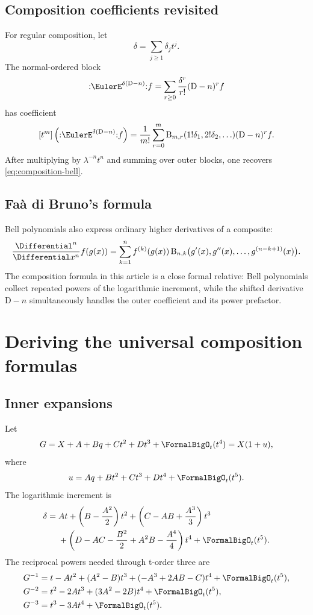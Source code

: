 \documentclass[11pt,openany]{book}
\theoremstyle{definition}
\theoremstyle{plain}
\theoremstyle{remark}
\newcommand{\Bell}{\operatorname{B}}
\newcommand{\Dop}{\mathrm{D}}
\begin{document}
\section{Composition coefficients revisited}
For regular composition, let
\[
 \delta=\sum_{j\ge1}\delta_jt^j.
\]
The normal-ordered block
\[
 \mathopen{:}\EulerE^{\delta(\Dop-n)}\mathclose{:}f
 =\sum_{r\ge0}\frac{\delta^r}{r!}(\Dop-n)^rf
\]
has coefficient
\begin{equation}\label{eq:bell-normal-block}
 [t^m]\left(
 \mathopen{:}\EulerE^{\delta(\Dop-n)}\mathclose{:}f
 \right)
 =\frac1{m!}\sum_{r=0}^m
 \Bell_{m,r}(1!\delta_1,2!\delta_2,\ldots)
 (\Dop-n)^rf.
\end{equation}
After multiplying by \(\lambda^{-n}t^n\) and summing over outer blocks, one
recovers \cref{eq:composition-bell}.

\section{Faà di Bruno's formula}
Bell polynomials also express ordinary higher derivatives of a composite:
\begin{equation}\label{eq:faa-di-bruno}
 \frac{\Differential^n}{\Differential x^n}f(g(x))
 =\sum_{k=1}^nf^{(k)}(g(x))
 \Bell_{n,k}\bigl(g'(x),g''(x),\ldots,g^{(n-k+1)}(x)\bigr).
\end{equation}
The composition formula in this article is a close formal relative: Bell
polynomials collect repeated powers of the logarithmic increment, while the
shifted derivative \(\Dop-n\) simultaneously handles the outer coefficient and
its power prefactor.

\chapter{Deriving the universal composition formulas}\label{app:universal-derivation}

\section{Inner expansions}
Let
\[
 G=X+A+Bq+Ct^2+Dt^3+\FormalBigO_t(t^4)
 =X(1+u),
\]
where
\[
 u=Aq+Bt^2+Ct^3+Dt^4+\FormalBigO_t(t^5).
\]
The logarithmic increment is
\begin{equation}\label{eq:appendix-delta}
\begin{split}
 \delta={}&At+\left(B-\frac{A^2}{2}\right)t^2
 +\left(C-AB+\frac{A^3}{3}\right)t^3\\
 &+\left(D-AC-\frac{B^2}{2}+A^2B-\frac{A^4}{4}\right)t^4
 +\FormalBigO_t(t^5).
\end{split}
\end{equation}
The reciprocal powers needed through t-order three are
\begin{align}
 G^{-1}={}&t-At^2+(A^2-B)t^3
 +(-A^3+2AB-C)t^4+\FormalBigO_t(t^5),\label{eq:Ginv-app}\\
 G^{-2}={}&t^2-2At^3+(3A^2-2B)t^4+\FormalBigO_t(t^5),\label{eq:Ginv2-app}\\
 G^{-3}={}&t^3-3At^4+\FormalBigO_t(t^5).\label{eq:Ginv3-app}
\end{align}
\end{document}
